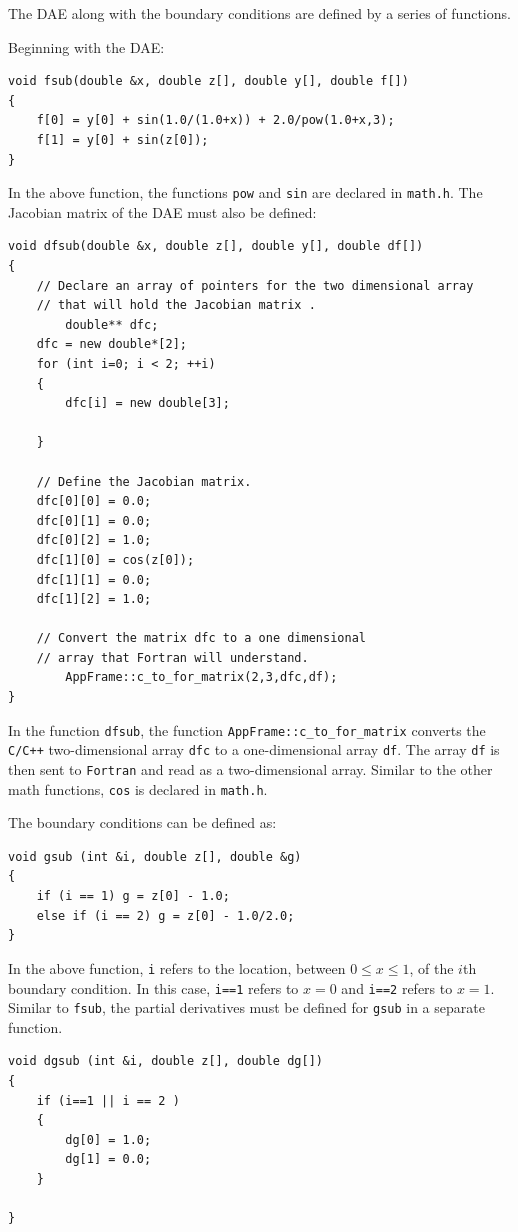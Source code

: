 The DAE along with the boundary conditions are defined by a series of functions.  

Beginning with the DAE:
\begin{lstlisting}
void fsub(double &x, double z[], double y[], double f[])
{
	f[0] = y[0] + sin(1.0/(1.0+x)) + 2.0/pow(1.0+x,3);
	f[1] = y[0] + sin(z[0]);
}
\end{lstlisting}
In the above function, the functions \texttt{pow} and \texttt{sin} are declared in \texttt{math.h}.  The Jacobian matrix of the DAE must also be defined: 
\begin{lstlisting}
void dfsub(double &x, double z[], double y[], double df[])
{
	// Declare an array of pointers for the two dimensional array
	// that will hold the Jacobian matrix . 
    	double** dfc;
	dfc = new double*[2];
	for (int i=0; i < 2; ++i)
	{
		dfc[i] = new double[3];
		
	}
	
	// Define the Jacobian matrix.
	dfc[0][0] = 0.0;
	dfc[0][1] = 0.0;
	dfc[0][2] = 1.0;
	dfc[1][0] = cos(z[0]);
	dfc[1][1] = 0.0;
	dfc[1][2] = 1.0;
	
	// Convert the matrix dfc to a one dimensional
	// array that Fortran will understand. 
    	AppFrame::c_to_for_matrix(2,3,dfc,df);
}
\end{lstlisting}  
In the function \texttt{dfsub}, the function \texttt{AppFrame::c\_to\_for\_matrix} converts the \texttt{C/C++} two-dimensional array \texttt{dfc} to a one-dimensional array \texttt{df}.  The array \texttt{df} is then sent to \texttt{Fortran} and read as a two-dimensional array. Similar to the other math functions, \texttt{cos} is declared in \texttt{math.h}.  

The boundary conditions can be defined as:
\begin{lstlisting}
void gsub (int &i, double z[], double &g)
{	
	if (i == 1) g = z[0] - 1.0;
	else if (i == 2) g = z[0] - 1.0/2.0;  
}
\end{lstlisting}
In the above function, \texttt{i} refers to the location, between $ 0 \leq x \leq 1$, of the $i$th boundary condition.  In this case, \texttt{i==1} refers to $x=0$ and \texttt{i==2} refers to $x=1$. Similar to \texttt{fsub}, the partial derivatives must be defined for \texttt{gsub} in a separate function. 
\begin{lstlisting}
void dgsub (int &i, double z[], double dg[])
{
	if (i==1 || i == 2 )
	{
		dg[0] = 1.0;
		dg[1] = 0.0;
	}
		
}
\end{lstlisting}

